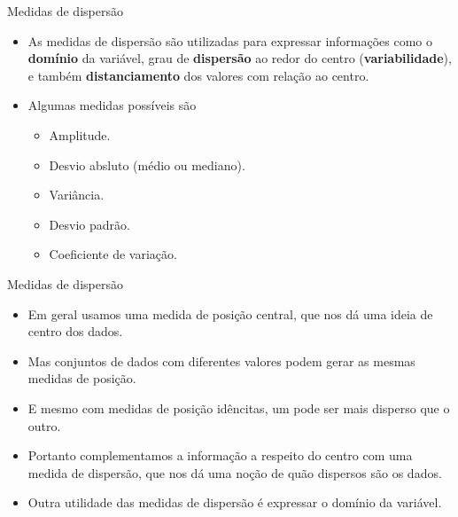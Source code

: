 \documentclass[
  ignorenonframetext,
  serif,
  professionalfont,
  usenames,
  dvipsnames,
  aspectratio = 169]{beamer}
\providecommand{\tightlist}{%
  \setlength{\itemsep}{0pt}\setlength{\parskip}{0pt}}
\renewcommand{\tightlist}{%
  \setlength{\itemsep}{0\baselineskip}
  \setlength{\parskip}{0.25\baselineskip}
}
\def\beginAHalfColumn{\begin{minipage}{0.49\textwidth}}%
\def\endColumns{\end{minipage}}%
\begin{document}
\begin{frame}{Medidas de dispersão}
\protect\hypertarget{medidas-de-dispersuxe3o-1}{}
\beginAHalfColumn

\begin{itemize}
\tightlist
\item
  As medidas de dispersão são utilizadas para expressar informações como
  o \textbf{domínio} da variável, grau de \textbf{dispersão} ao redor do
  centro (\textbf{variabilidade}), e também \textbf{distanciamento} dos
  valores com relação ao centro.
\end{itemize}

\endColumns
\beginAHalfColumn

\begin{itemize}
\tightlist
\item
  Algumas medidas possíveis são

  \begin{itemize}
  \tightlist
  \item
    Amplitude.
  \item
    Desvio absluto (médio ou mediano).
  \item
    Variância.
  \item
    Desvio padrão.
  \item
    Coeficiente de variação.
  \end{itemize}
\end{itemize}

\endColumns
\end{frame}

\begin{frame}{Medidas de dispersão}
\protect\hypertarget{medidas-de-dispersuxe3o-2}{}
\begin{itemize}
\item
  Em geral usamos uma medida de posição central, que nos dá uma ideia de
  centro dos dados.
\item
  Mas conjuntos de dados com diferentes valores podem gerar as mesmas
  medidas de posição.
\item
  E mesmo com medidas de posição idêncitas, um pode ser mais disperso
  que o outro.
\item
  Portanto complementamos a informação a respeito do centro com uma
  medida de dispersão, que nos dá uma noção de quão dispersos são os
  dados.
\item
  Outra utilidade das medidas de dispersão é expressar o domínio da
  variável.
\end{itemize}
\end{frame}
\end{document}
